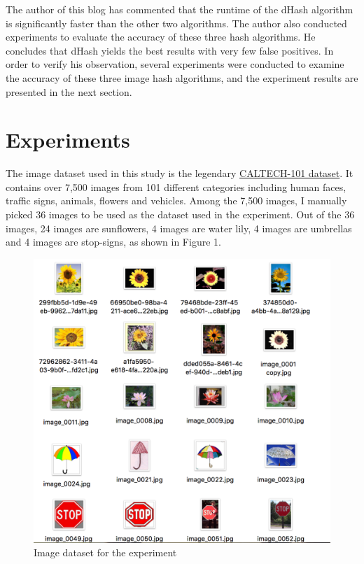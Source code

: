 \documentclass[letterpaper,12pt]{article}
\begin{document}
The author of this blog has commented that the runtime of the dHash algorithm is significantly faster than the other two algorithms. The author also conducted experiments to evaluate the accuracy of these three hash algorithms. He concludes that dHash yields the best results with very few false positives. In order to verify his observation, several experiments were conducted to examine the accuracy of these three image hash algorithms, and the experiment results are presented in the next section.


\section{Experiments}

The image dataset used in this study is the legendary \href{http://www.vision.caltech.edu/Image_Datasets/Caltech101/}{CALTECH-101 dataset}. It contains over 7,500 images from 101 different categories including human faces, traffic signs, animals, flowers and vehicles. Among the 7,500 images, I manually picked 36 images to be used as the dataset used in the experiment. Out of the 36 images, 24 images are sunflowers, 4 images are water lily, 4 images are umbrellas and 4 images are stop-signs, as shown in Figure 1. 

\begin{figure}[h!]
	\centering
	\includegraphics[scale=0.4]{figures/figure_1}
	\caption{Image dataset for the experiment}
\end{figure}
\end{document}

